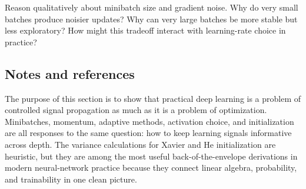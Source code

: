 \begin{exercise}
Reason qualitatively about minibatch size and gradient noise.
Why do very small batches produce noisier updates?
Why can very large batches be more stable but less exploratory?
How might this tradeoff interact with learning-rate choice in practice?
\end{exercise}

\subsection*{Notes and references}

The purpose of this section is to show that practical deep learning is a problem of controlled signal propagation as much as it is a problem of optimization.
Minibatches, momentum, adaptive methods, activation choice, and initialization are all responses to the same question: how to keep learning signals informative across depth.
The variance calculations for Xavier and He initialization are heuristic, but they are among the most useful back-of-the-envelope derivations in modern neural-network practice because they connect linear algebra, probability, and trainability in one clean picture.
